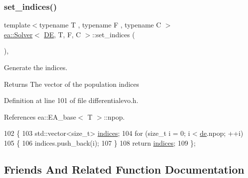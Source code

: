 \subsubsection{\texorpdfstring{set\+\_\+indices()}{set\_indices()}}
{\footnotesize\ttfamily template$<$typename T , typename F , typename C $>$ \\
\hyperlink{classea_1_1_solver}{ea\+::\+Solver}$<$ \hyperlink{structea_1_1_d_e}{DE}, T, F, C $>$\+::set\+\_\+indices (\begin{DoxyParamCaption}{ }\end{DoxyParamCaption})\hspace{0.3cm}{\ttfamily [inline]}, {\ttfamily [private]}}



Generate the indices. 

\begin{DoxyReturn}{Returns}
The vector of the population indices 
\end{DoxyReturn}


Definition at line 101 of file differentialevo.\+h.



References ea\+::\+E\+A\+\_\+base$<$ T $>$\+::npop.


\begin{DoxyCode}
102         \{
103             std::vector<size\_t> \hyperlink{classea_1_1_solver_3_01_d_e_00_01_t_00_01_f_00_01_c_01_4_a8428ecceaab1c7e26715ed2f72654693}{indices};
104             \textcolor{keywordflow}{for} (\textcolor{keywordtype}{size\_t} i = 0; i < \hyperlink{classea_1_1_solver_3_01_d_e_00_01_t_00_01_f_00_01_c_01_4_a789b8665ce321248e3999907c37d0963}{de}.npop; ++i)
105             \{
106                 indices.push\_back(i);
107             \}
108             \textcolor{keywordflow}{return} \hyperlink{classea_1_1_solver_3_01_d_e_00_01_t_00_01_f_00_01_c_01_4_a8428ecceaab1c7e26715ed2f72654693}{indices};
109         \};
\end{DoxyCode}


\subsection{Friends And Related Function Documentation}
\mbox{\label{classea_1_1_solver_3_01_d_e_00_01_t_00_01_f_00_01_c_01_4_af331e622818a725800b24cd03d46f3f1}} 
